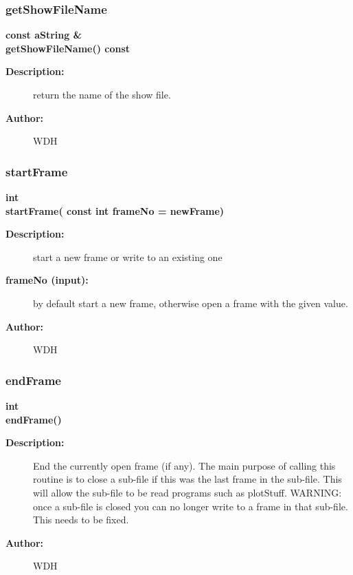 \subsubsection{getShowFileName}
 
\begin{flushleft} \textbf{%
const aString \&  \\ 
\settowidth{\OgshowIncludeArgIndent}{getShowFileName(}%
getShowFileName() const
}\end{flushleft}
\begin{description}
\item[{\bf Description:}] 
   return the name of the show file.
\item[{\bf Author:}]  WDH
\end{description}
\subsubsection{startFrame}
 
\begin{flushleft} \textbf{%
int  \\ 
\settowidth{\OgshowIncludeArgIndent}{startFrame(}%
startFrame( const int frameNo  = newFrame)
}\end{flushleft}
\begin{description}
\item[{\bf Description:}] 
   start a new frame or write to an existing one
\item[{\bf frameNo (input):}]  by default start a new frame, otherwise open a frame with
   the given value.
\item[{\bf Author:}]  WDH
\end{description}
\subsubsection{endFrame}
 
\begin{flushleft} \textbf{%
int  \\ 
\settowidth{\OgshowIncludeArgIndent}{endFrame(}%
endFrame()
}\end{flushleft}
\begin{description}
\item[{\bf Description:}] 
   End the currently open frame (if any). The main purpose of calling
 this routine is to close a sub-file if this was the last frame in the sub-file.
 This will allow the sub-file to be read programs such as plotStuff.
 WARNING: once a sub-file is closed you can no longer write to a frame in that sub-file.
  This needs to be fixed.
 
\item[{\bf Author:}]  WDH
\end{description}

